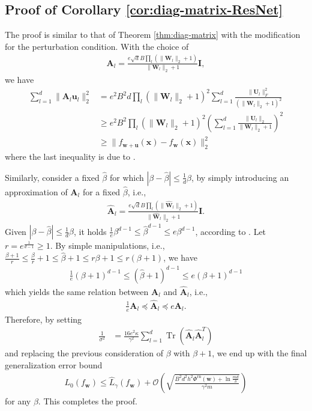 \documentclass[journal]{IEEEtran} %
\newcommand{\nn}{\nonumber}
\def\vu{{\bm{u}}}
\def\vw{{\bm{w}}}
\def\vx{{\bm{x}}}
\def\mA{{\bm{A}}}
\def\mI{{\bm{I}}}
\def\mU{{\bm{U}}}
\def\mW{{\bm{W}}}
\newcommand{\Norm}[1]{\|#1\|}
\newcommand{\Abs}[1]{|#1|}
\DeclareMathOperator{\Tr}{Tr}
\begin{document}
\subsection{Proof of Corollary \ref{cor:diag-matrix-ResNet}}
\label{proof:diag-matrix-ResNet}
The proof is similar to that of Theorem \ref{thm:diag-matrix} with the modification for the perturbation condition.
With the choice of 
\begin{align}
    {\mA}_l =  \frac{e\sqrt{d}B \prod_l (\Norm{{\mW}_l}_2+1)  }{\Norm{{\mW}_l}_2+1} \mI,
\end{align}
we have
\begin{align}
    \sum_{l=1}^d\Norm{\mA_l \vu_l}_2^2 &= e^2B^2 d\prod_l (\Norm{\mW_l}_2+1)^2  \sum_{l=1}^d \frac{\Norm{\mU_l}_F^2}{(\Norm{\mW_l}_2+1)^2} \\
    &\ge e^2B^2 \prod_l (\Norm{\mW_l}_2+1)^2 \left(\sum_{l=1}^d \frac{\Norm{\mU_l}_2}{\Norm{\mW_l}_2+1}\right)^2 \nn\\
    &\ge \Norm{f_{\vw+\vu}(\vx)-f_{\vw}(\vx)}_2^2
\end{align}
where the last inequality is due to \cite[Theorem 8]{xiao2023pac}.

Similarly, consider a fixed $\hat{\beta}$ for which $\Abs{\beta-\hat{\beta}} \le \frac{1}{d}\beta$, by simply introducing an approximation of $\mA_l$ for a fixed $\hat{\beta}$, i.e.,
\begin{align}
    \hat{\mA}_l =  \frac{e\sqrt{d}B \prod_l (\Norm{\hat{\mW}_l}_2+1)  }{\Norm{\hat{\mW}_l}_2+1} \mI.
\end{align}
Given $\Abs{\beta-\hat{\beta}} \le \frac{1}{d}\beta$, it holds $\frac{1}{e} \beta^{d-1} \le \hat{\beta}^{d-1} \le e\beta^{d-1}$, according to \cite{neyshabur2018pac}. Let $r=e^{\frac{1}{d-1}} \ge 1$. By simple manipulations, i.e., $\frac{\beta+1}{r} \le \frac{\beta}{r}+1 \le \hat{\beta}+1 \le r \beta + 1 \le r(\beta+1) $, we have
\begin{align}
    \frac{1}{e} (\beta+1)^{d-1} \le (\hat{\beta}+1)^{d-1} \le e(\beta+1)^{d-1}
\end{align}
which yields the same relation between $\mA_l$ and $\hat{\mA}_l$, i.e.,
\begin{align}
   \frac{1}{e} \mA_l \preceq \hat{\mA}_l \preceq e \mA_l.
\end{align}
Therefore, by setting
\begin{align} \label{eq:choice-sigma-diag-ResNet}
    \frac{1}{{\sigma}^2} &= \frac{16e^2 \kappa}{\gamma^2} \sum_{l=1}^d \Tr(\hat{\mA}_l  \hat{\mA}_l^T)
\end{align}
and replacing the previous consideration of $\beta$ with $\beta+1$, we end up with the final generalization error bound
\begin{align}
    L_0(f_{\vw}) \le \hat{L}_{\gamma}(f_{\vw}) + \mathcal{O} \left( \sqrt{ \frac{B^2d^2h^2 \Phi^{\mathrm{rn}}(\vw) + \ln \frac{md}{\delta}}{\gamma^2m}} \right)
\end{align}
for any $\beta$. 
This completes the proof.
\end{document}
